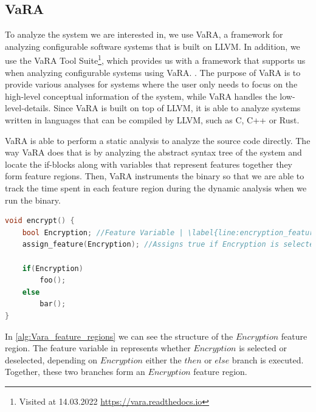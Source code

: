 \subsection{VaRA}\label{VaRA}
To analyze the system we are interested in, we use VaRA, a framework for analyzing configurable software systems that is built on LLVM.
In addition, we use the VaRA Tool Suite\footnote{Visited at 14.03.2022 \url{https://vara.readthedocs.io}}, which provides us with a framework that supports
us when analyzing configurable systems using VaRA.
. 
The purpose of VaRA is to provide various analyses for systems where the user only needs to focus on the high-level conceptual information of the 
system, while VaRA handles the low-level-details. 
Since VaRA is built on top of LLVM, it is able to analyze systems written in languages that can be compiled by LLVM, such as C, C++ or Rust. 

VaRA is able to perform a static analysis to analyze the source code directly. The way VaRA does that is by analyzing the
abstract syntax tree of the system and locate the if-blocks along with variables that represent features together they form 
feature regions. Then, VaRA instruments the binary so that we are able to track the time spent in each feature region
during the dynamic analysis when we run the binary. \cite{VaRA-Flo}

\lstset{style=myStyle}
\begin{minipage}{\linewidth}
\begin{lstlisting}[caption={Feature region example},language=C++,label={alg:Vara_feature_regions},escapechar=|]
void encrypt() {
    bool Encryption; //Feature Variable | \label{line:encryption_feature_variable} |
    assign_feature(Encryption); //Assigns true if Encryption is selected
    
    if(Encryption)
        foo();
    else
        bar();
}
\end{lstlisting}
\end{minipage}


In \autoref{alg:Vara_feature_regions} we can see the structure of the $Encryption$ feature region. The
feature variable in  represents whether $Encryption$ is selected or deselected, 
depending on $Encryption$ either the $then$ or $else$ branch is executed. 
Together, these two branches form an $Encryption$ feature region.

